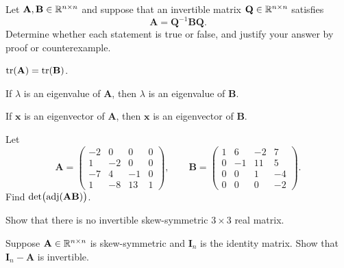 \begin{problem}
Let $\mathbf A,\mathbf B\in\mathbb{R}^{n\times n}$ and suppose that an invertible matrix $\mathbf Q\in\mathbb{R}^{n\times n}$ satisfies
\[
\mathbf A=\mathbf Q^{-1}\mathbf B\mathbf Q.
\]
Determine whether each statement is true or false, and justify your answer by proof or counterexample.
\begin{problemchoices}
\item $\operatorname{tr}(\mathbf A)=\operatorname{tr}(\mathbf B)$.
\item If $\lambda$ is an eigenvalue of $\mathbf A$, then $\lambda$ is an eigenvalue of $\mathbf B$.
\item If $\mathbf x$ is an eigenvector of $\mathbf A$, then $\mathbf x$ is an eigenvector of $\mathbf B$.
\end{problemchoices}
\end{problem}

\begin{problem}
Let
\[
\mathbf A=
\begin{pmatrix}
-2&0&0&0\\
1&-2&0&0\\
-7&4&-1&0\\
1&-8&13&1
\end{pmatrix},
\qquad
\mathbf B=
\begin{pmatrix}
1&6&-2&7\\
0&-1&11&5\\
0&0&1&-4\\
0&0&0&-2
\end{pmatrix}.
\]
Find $\det\bigl(\operatorname{adj}(\mathbf A\mathbf B)\bigr)$.
\end{problem}

\begin{problem}
\begin{problemsubparts}
\item Show that there is no invertible skew-symmetric $3\times3$ real matrix.
\item Suppose $\mathbf A\in\mathbb{R}^{n\times n}$ is skew-symmetric and $\mathbf I_n$ is the identity matrix. Show that $\mathbf I_n-\mathbf A$ is invertible.
\end{problemsubparts}
\end{problem}

